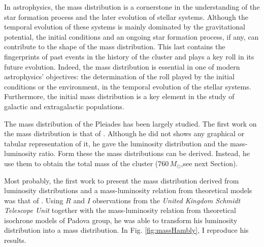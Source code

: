 In astrophysics, the mass distribution is a cornerstone in the understanding of the star formation process and the later evolution of stellar systems. Although the temporal evolution of these systems is mainly dominated by the gravitational potential, the initial conditions and an ongoing star formation process, if any, can contribute to the shape of the mass distribution. This last contains the fingerprints of past events in the history of the cluster and plays a key roll in its future evolution. Indeed, the mass distribution is essential in one of modern astrophysics' objectives: the determination of the roll played by the initial conditions or the environment, in the temporal evolution of the stellar systems. Furthermore, the initial mass distribution is a key element in the study of galactic and extragalactic populations.  

The mass distribution of the Pleiades has been largely studied. The first work on the mass distribution is that of \citet{Limber1962}. Although he did not shows any graphical or tabular representation of it, he gave the luminosity distribution and the mass-luminosity ratio. Form these the mass distributions can be derived. Instead, he use them to obtain the total mass of the cluster ($760\,M_{\odot}$,see next Section). 

Most probably, the first work to present the mass distribution derived from luminosity distributions and a mass-luminosity relation from theoretical models was that of \citet{Hambly1991}. Using $R$ and $I$ observations from the \emph{United Kingdom Schmidt Telescope Unit} together with the mass-luminosity relation from theoretical isochrone models of Padova group, he was able to transform his luminosity distribution into a mass distribution. In Fig. \ref{fig:massHambly}, I reproduce his results. 

